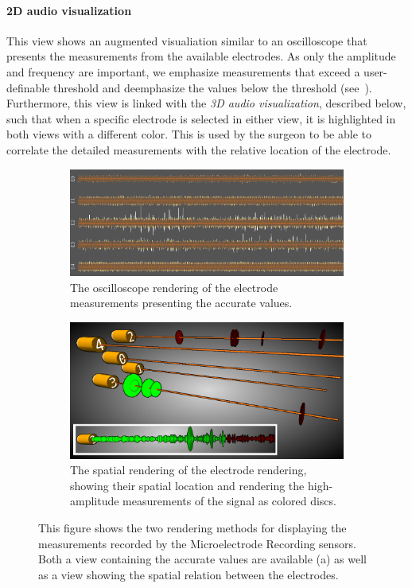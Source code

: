 \paragraph{2D audio visualization} This view shows an augmented visualiation similar to an oscilloscope that presents the measurements from the available electrodes. As only the amplitude and frequency are important, we emphasize measurements that exceed a user-definable threshold and deemphasize the values below the threshold (see~). Furthermore, this view is linked with the \emph{3D audio visualization}, described below, such that when a specific electrode is selected in either view, it is highlighted in both views with a different color. This is used by the surgeon to be able to correlate the detailed measurements with the relative location of the electrode.
\begin{figure}
\centering
    \begin{subfigure}[b]{0.49\linewidth}
        \includegraphics[width=\linewidth]{figures/contributions/dbs/audio-signal.png}
        \caption{The  oscilloscope rendering of the electrode measurements presenting the accurate values.}
        \label{contributions:medbio:dbs:sound:2d}
    \end{subfigure}
    \hfill
    \begin{subfigure}[b]{0.49\linewidth}
        \includegraphics[width=\linewidth]{figures/contributions/dbs/recording-3dsound.png}
        \caption{The spatial  rendering of the electrode rendering, showing their spatial location and rendering the high-amplitude measurements of the signal as colored discs.}
        \label{contributions:medbio:dbs:sound:3d}
    \end{subfigure}
    \caption{This figure shows the two rendering methods for displaying the measurements recorded by the Microelectrode Recording sensors. Both a view containing the accurate values are available (a) as well as a view showing the spatial relation between the electrodes.}
    \label{contributions:medbio:dbs:sound}
\end{figure}

